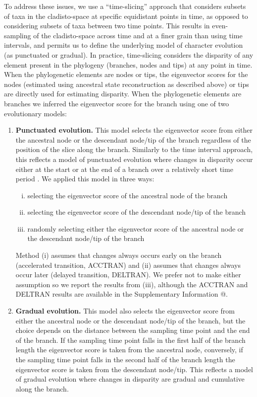 \documentclass[12pt,letterpaper]{article}
\begin{document}
To address these issues, we use a ``time-slicing'' approach that considers subsets of taxa in the cladisto-space at specific equidistant points in time, as opposed to considering subsets of taxa between two time points.
This results in even-sampling of the cladisto-space across time and at a finer grain than using time intervals, and permits us to define the underlying model of character evolution (as punctuated or gradual).  
In practice, time-slicing considers the disparity of any element present in the phylogeny (branches, nodes and tips) at any point in time.
When the phylogenetic elements are nodes or tips, the eigenvector scores for the nodes (estimated using ancestral state reconstruction as described above) or tips are directly used for estimating disparity.
When the phylogenetic elements are branches we inferred the eigenvector score for the branch using one of two evolutionary models:
\begin{enumerate}
    \item{\textbf{Punctuated evolution.}} 
    This model selects the eigenvector score from either the ancestral node or the descendant node/tip of the branch regardless of the position of the slice along the branch. 
    Similarly to the time interval approach, this reflects a model of punctuated evolution where changes in disparity occur either at the start or at the end of a branch over a relatively short time period \citep{Gould1977}.
    We applied this model in three ways: 
    \begin{enumerate}[(i)]
      \item selecting the eigenvector score of the ancestral node of the branch
      \item selecting the eigenvector score of the descendant node/tip of the branch
      \item randomly selecting either the eigenvector score of the ancestral node or the descendant node/tip of the branch
    \end{enumerate}
    Method (i) assumes that changes always occurs early on the branch (accelerated transition, ACCTRAN) and (ii) assumes that changes always occur later (delayed transition, DELTRAN).
    We prefer not to make either assumption so we report the results from (iii), although the ACCTRAN and DELTRAN results are available in the Supplementary Information @. %
    \item{\textbf{Gradual evolution.}}
    This model also selects the eigenvector score from either the ancestral node or the descendant node/tip of the branch, but the choice depends on the distance between the sampling time point and the end of the branch.
    If the sampling time point falls in the first half of the branch length the eigenvector score is taken from the ancestral node, conversely, if the sampling time point falls in the second half of the branch length the eigenvector score is taken from the descendant node/tip.
    This reflects a model of gradual evolution where changes in disparity are gradual and cumulative along the branch.
\end{enumerate}
\end{document}
